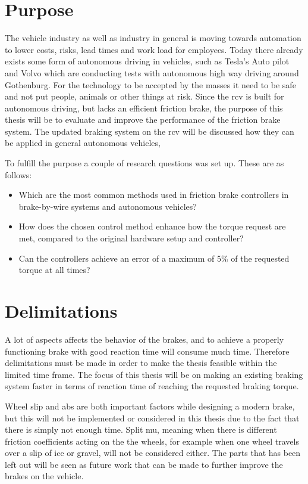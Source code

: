 \documentclass[a4paper,11pt]{kth-mag}
\begin{document}
\section{Purpose}
The vehicle industry as well as industry in general is moving towards automation to lower costs, risks, lead times and work load for employees. Today there already exists some form of autonomous driving in vehicles, such as Tesla's Auto pilot and Volvo which are conducting tests with autonomous high way driving around Gothenburg. For the technology to be accepted by the masses it need to be safe and not put people, animals or other things at risk. Since the \gls{rcv} is built for autonomous driving, but lacks an efficient friction brake, the purpose of this thesis will be to evaluate and improve the performance of the friction brake system. The updated braking system on the \gls{rcv} will be discussed how they can be applied in general autonomous vehicles, 

To fulfill the purpose a couple of research questions was set up. These are as follows: 
\begin{itemize}
\item Which are the most common methods used in friction brake controllers in brake-by-wire systems and autonomous vehicles? 
\item How does the chosen control method enhance how the torque request are met, compared to the original hardware setup and controller?
\item Can the controllers achieve an error of a maximum of 5\% of the requested torque at all times?
\end{itemize}

\section{Delimitations}
A lot of aspects affects the behavior of the brakes, and to achieve a properly functioning brake with good reaction time will consume much time. Therefore delimitations must be made in order to make the thesis feasible within the limited time frame. The focus of this thesis will be on making an existing braking system faster in terms of reaction time of reaching the requested braking torque. 

Wheel slip and \gls{abs} are both important factors while designing a modern brake, but this will not be implemented or considered in this thesis due to the fact that there is simply not enough time. Split mu, meaning when there is different friction coefficients acting on the the wheels, for example when one wheel travels over a slip of ice or gravel, will not be considered either. The parts that has been left out will be seen as future work that can be made to further improve the brakes on the vehicle. 
\end{document}
